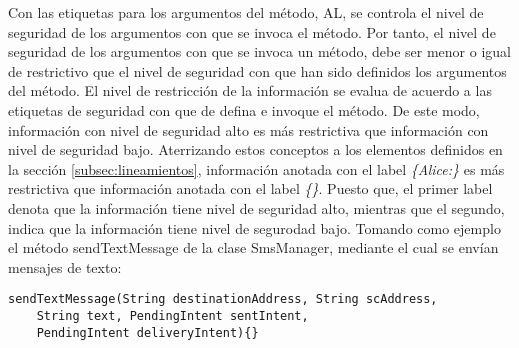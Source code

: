 Con las etiquetas para los argumentos del método, AL, se controla el nivel de
seguridad de los argumentos con que se invoca el método. Por tanto, el nivel de
seguridad de los argumentos con que se invoca un método, debe ser menor o igual
de restrictivo que el nivel de seguridad con que han sido definidos los
argumentos del método.\newline
El nivel de restricción de la información se evalua de acuerdo a las
etiquetas de seguridad con que de defina e invoque el método. De este modo,
información con nivel de seguridad alto es más restrictiva que información con nivel de
seguridad bajo.
Aterrizando estos conceptos a los elementos definidos en la sección
\ref{subsec:lineamientos}, información anotada con el label \emph{\{Alice:\}} es
más restrictiva que información anotada con el label \emph{\{\}}. Puesto que, el
primer label denota que la información tiene nivel de seguridad alto, mientras
que el segundo, indica que la información tiene nivel de segurodad bajo.\newline 
Tomando como ejemplo el método sendTextMessage de la clase SmsManager, mediante
el cual se envían mensajes de texto:
\begin{lstlisting}[basicstyle=\scriptsize]
sendTextMessage(String destinationAddress, String scAddress, 
	String text, PendingIntent sentIntent, 
	PendingIntent deliveryIntent){}
\end{lstlisting}

